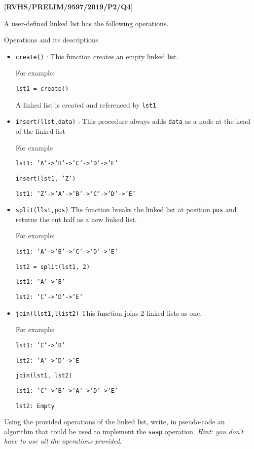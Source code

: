 \item \textbf{{[}RVHS/PRELIM/9597/2019/P2/Q4{]} }

A user-defined linked list has the following operations.

Operations and its descriptions 
\begin{itemize}
\item \texttt{create()} : This function creates an empty linked list.

For example: 

\texttt{lst1 = create()}

A linked list is created and referenced by \texttt{lst1}.
\item \texttt{insert(llst,data)} : This procedure always adds \texttt{data}
as a node at the head of the linked list

For example

\noindent %
\noindent\begin{minipage}[t]{1\columnwidth}%
\texttt{lst1: 'A'->'B'->'C'->'D'->'E'}

\texttt{insert(lst1, 'Z')}

\texttt{lst1: 'Z'->'A'->'B'->'C'->'D'->'E'}%
\end{minipage}
\item \texttt{split(llst,pos)} The function breaks the linked list at position
\texttt{pos} and returns the cut half as a new linked list.

For example: 

\noindent %
\noindent\begin{minipage}[t]{1\columnwidth}%
\texttt{lst1: 'A'->'B'->'C'->'D'->'E'}

\texttt{lst2 = split(lst1, 2)}

\texttt{lst1: 'A'->'B' }

\texttt{lst2: 'C'->'D'->'E'}%
\end{minipage}
\item \texttt{join(llst1,llist2)} This function joins 2 linked lists as
one.

For example: 

\noindent %
\noindent\begin{minipage}[t]{1\columnwidth}%
\texttt{lst1: 'C'->'B' }

\texttt{lst2: 'A'->'D'->'E}

\texttt{join(lst1, lst2)}

\texttt{lst1: 'C'->'B'->'A'->'D'->'E' }

\texttt{lst2: Empty}%
\end{minipage}
\end{itemize}
Using the provided operations of the linked list, write, in pseudo-code
an algorithm that could be used to implement the \texttt{swap} operation.
\emph{Hint: you don\textquoteright t have to use all the operations
provided}.

